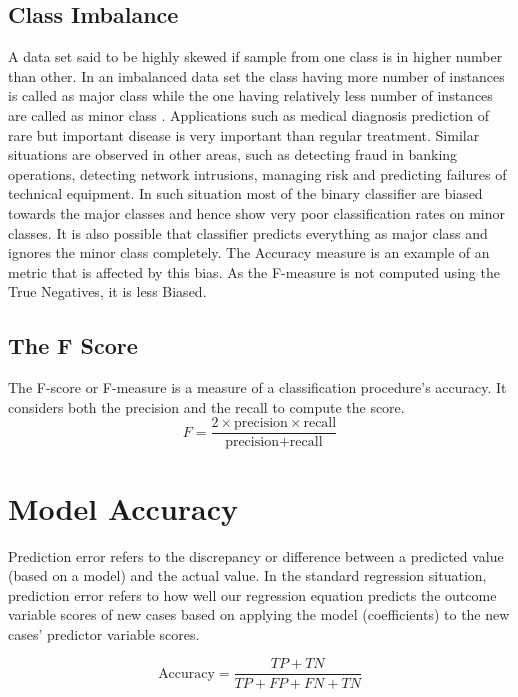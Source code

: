 \documentclass[]{report}
\begin{document}
\subsection*{Class Imbalance}
A data set said to be highly skewed if sample from one class is in higher number than other. In an imbalanced data set the class having more number of instances is called as major class while the one having relatively less number of instances are called as minor class .
Applications such as medical diagnosis prediction of rare but important disease is very important than regular treatment. Similar situations are observed in other areas, such as detecting fraud in banking operations, detecting network intrusions, managing risk and predicting failures of technical equipment. 
 In such situation most of the binary classifier are biased towards the major classes and hence show very poor classification rates on minor classes. It is also possible that classifier predicts everything as major class and ignores the minor class completely.
The Accuracy measure is an example of an metric that is affected by this bias. As the F-measure is not computed using the True Negatives, it is less Biased.


\subsection*{The F Score}
The F-score or F-measure is a measure of a classification procedure’s accuracy.
It considers both the precision and the recall to compute the score.
\[ F = \frac{2 \times \mbox{precision} \times \mbox{recall}}{\mbox{precision} + \mbox{recall}}\]

\newpage
\section{Model Accuracy}
Prediction error refers to the discrepancy or difference between a predicted value (based on a
model) and the actual value. In the standard regression situation, prediction error refers to how
well our regression equation predicts the outcome variable scores of new cases based on
applying the model (coefficients) to the new cases’ predictor variable scores.

\begin{equation}
\text{Accuracy}=\frac{TP+TN}{TP+FP+FN+TN}
\end{equation}
\end{document}
